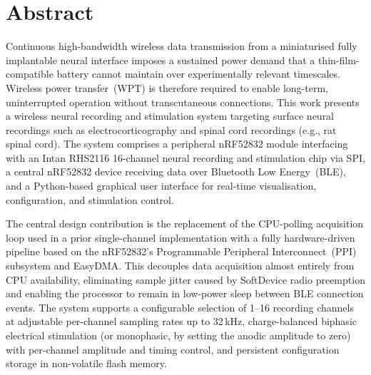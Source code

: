 \documentclass[a4paper,11pt]{article}
\begin{document}


\newpage

\null
\thispagestyle{empty}

\newpage




\newpage

\null
\thispagestyle{empty}

\newpage

\section*{Abstract}

Continuous high-bandwidth wireless data transmission from a miniaturised fully
implantable neural interface imposes a sustained power demand that a
thin-film-compatible battery cannot maintain over experimentally relevant timescales.
Wireless power transfer~(WPT) is therefore required to enable long-term,
uninterrupted operation without transcutaneous connections. This work presents a
wireless neural recording and stimulation system targeting surface neural recordings such as electrocorticography and spinal cord
recordings (e.g., rat spinal cord).
The system comprises a peripheral nRF52832 module interfacing with an Intan RHS2116
16-channel neural recording and stimulation chip via SPI, a central nRF52832 device
receiving data over Bluetooth Low Energy~(BLE), and a Python-based graphical user
interface for real-time visualisation, configuration, and stimulation control.

The central design contribution is the replacement of the CPU-polling acquisition loop
used in a prior single-channel implementation with a fully hardware-driven pipeline based
on the nRF52832's Programmable Peripheral Interconnect~(PPI) subsystem and EasyDMA.
This decouples data acquisition almost entirely from CPU availability, eliminating
sample jitter caused by SoftDevice radio preemption and enabling the processor to remain
in low-power sleep between BLE connection events. The system supports a configurable
selection of 1--16 recording channels at adjustable per-channel sampling rates up to
32\,kHz, charge-balanced biphasic electrical stimulation (or monophasic, by setting the
anodic amplitude to zero) with per-channel amplitude and
timing control, and persistent configuration storage in non-volatile flash memory.
\end{document}
